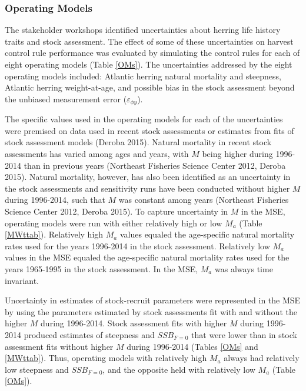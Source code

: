 \documentclass[]{article}
\begin{document}
\subsubsection{Operating Models}\label{operating-models}

The stakeholder workshops identified uncertainties about herring life
history traits and stock assessment. The effect of some of these
uncertainties on harvest control rule performance was evaluated by
simulating the control rules for each of eight operating models (Table
\ref{OMs}). The uncertainties addressed by the eight operating models
included: Atlantic herring natural mortality and steepness, Atlantic
herring weight-at-age, and possible bias in the stock assessment beyond
the unbiased measurement error (\(\varepsilon_{\phi y}\)).

The specific values used in the operating models for each of the
uncertainties were premised on data used in recent stock assessments or
estimates from fits of stock assessment models (Deroba 2015). Natural
mortality in recent stock assessments has varied among ages and years,
with \(M\) being higher during 1996-2014 than in previous years
(Northeast Fisheries Science Center 2012, Deroba 2015). Natural
mortality, however, has also been identified as an uncertainty in the
stock assessments and sensitivity runs have been conducted without
higher \(M\) during 1996-2014, such that \(M\) was constant among years
(Northeast Fisheries Science Center 2012, Deroba 2015). To capture
uncertainty in \(M\) in the MSE, operating models were run with either
relatively high or low \(M_a\) (Table \ref{MWttab}). Relatively high
\(M_a\) values equaled the age-specific natural mortality rates used for
the years 1996-2014 in the stock assessment. Relatively low \(M_a\)
values in the MSE equaled the age-specific natural mortality rates used
for the years 1965-1995 in the stock assessment. In the MSE, \(M_a\) was
always time invariant.

Uncertainty in estimates of stock-recruit parameters were represented in
the MSE by using the parameters estimated by stock assessments fit with
and without the higher \(M\) during 1996-2014. Stock assessment fits
with higher \(M\) during 1996-2014 produced estimates of steepness and
\(SSB_{F=0}\) that were lower than in stock assessment fits without
higher \(M\) during 1996-2014 (Tables \ref{OMs} and \ref{MWttab}). Thus,
operating models with relatively high \(M_a\) always had relatively low
steepness and \(SSB_{F=0}\), and the opposite held with relatively low
\(M_a\) (Table \ref{OMs}).
\end{document}
